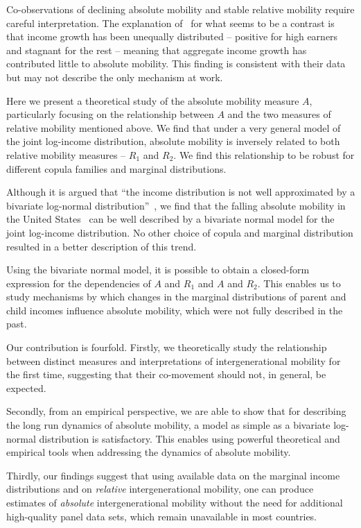 \documentclass[12pt,a4paper]{article}
\numberwithin{equation}{section}
\begin{document}
Co-observations of declining absolute mobility and stable relative mobility require careful interpretation. The explanation of~\citet{chetty2017fading} for what seems to be a contrast is that income growth has been unequally distributed -- positive for high earners and stagnant for the rest -- meaning that aggregate income growth has contributed little to absolute mobility. This finding is consistent with their data but may not describe the only mechanism at work.

Here we present a theoretical study of the absolute mobility measure $A$, particularly focusing on the relationship between $A$ and the two measures of relative mobility mentioned above. We find that under a very general model of the joint log-income distribution, absolute mobility is inversely related to both relative mobility measures -- $R_1$ and $R_2$. We find this relationship to be robust for different copula families and marginal distributions.

Although it is argued that ``the income distribution is not well approximated by a bivariate log-normal distribution''~\citep[p.~1574]{chetty2014land}, we find that the falling absolute mobility in the United States~\citep{chetty2017fading} can be well described by a bivariate normal model for the joint log-income distribution. No other choice of copula and marginal distribution resulted in a better description of this trend.

Using the bivariate normal model, it is possible to obtain a closed-form expression for the dependencies of $A$ and $R_1$ and $A$ and $R_2$. This enables us to study mechanisms by which changes in the marginal distributions of parent and child incomes influence absolute mobility, which were not fully described in the past.

Our contribution is fourfold. Firstly, we theoretically study the relationship between distinct measures and interpretations of intergenerational mobility for the first time, suggesting that their co-movement should not, in general, be expected.

Secondly, from an empirical perspective, we are able to show that for describing the long run dynamics of absolute mobility, a model as simple as a bivariate log-normal distribution is satisfactory. This enables using powerful theoretical and empirical tools when addressing the dynamics of absolute mobility.

Thirdly, our findings suggest that using available data on the marginal income distributions and on \textit{relative} intergenerational mobility, one can produce estimates of \textit{absolute} intergenerational mobility without the need for additional high-quality panel data sets, which remain unavailable in most countries.
\end{document}
